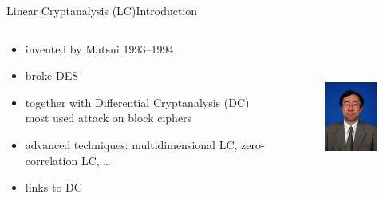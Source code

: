 \begin{frame}{Linear Cryptanalysis (LC)}{Introduction}
	\begin{columns}[T]
		\begin{column}{.58\textwidth}
			\begin{itemize}
				\item invented by Matsui 1993--1994
				\item broke DES
				\item together with Differential Cryptanalysis (DC) most used attack on block ciphers
			\end{itemize}
			\vspace{1em}
			\begin{itemize}
				\item advanced techniques: multidimensional LC, zero-correlation LC, \ldots
				\item links to DC%
			\end{itemize}
		\end{column}
		\hfill
		\begin{column}{.38\textwidth}
			\begin{figure}[!ht]
				\includegraphics[height=50mm]{data/matsui.jpg}
			\end{figure}
		\end{column}
	\end{columns}
\end{frame}


